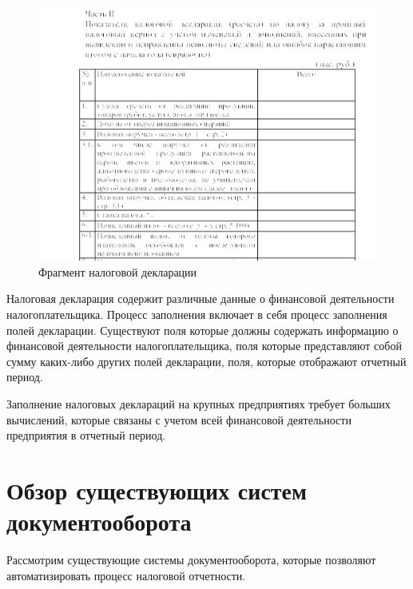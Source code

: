 \documentclass[14pt,a4paper]{reportmod}
\begin{document}
\begin{figure}
  \centering
  \includegraphics[scale=0.4]{pics/taxformrb}
  \caption{Фрагмент налоговой декларации}
  \label{pic:taxformrb}
\end{figure}


Налоговая декларация содержит различные данные о финансовой деятельности налогоплательщика. Процесс заполнения включает в себя процесс заполнения полей декларации. Существуют поля которые должны содержать информацию о финансовой деятельности налогоплательщика, поля которые представляют собой сумму каких-либо других полей декларации, поля, которые отображают отчетный период.

Заполнение налоговых деклараций на крупных предприятиях требует больших вычислений, которые связаны с учетом всей финансовой деятельности предприятия в отчетный период.
\section{Обзор существующих систем документооборота}
Рассмотрим существующие системы документооборота, которые позволяют автоматизировать процесс налоговой отчетности.
\end{document}

